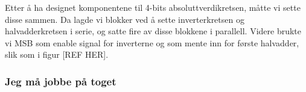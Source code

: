 
Etter å ha designet komponentene til 4-bits absoluttverdikretsen, måtte vi sette disse sammen.
Da lagde vi blokker ved å sette inverterkretsen og halvadderkretsen i serie, og satte fire av disse blokkene i parallell.
Videre brukte vi MSB som enable signal for inverterne og som mente inn for første halvadder, slik som i figur [REF HER]. 

\subsubsection{Jeg må jobbe på toget}
